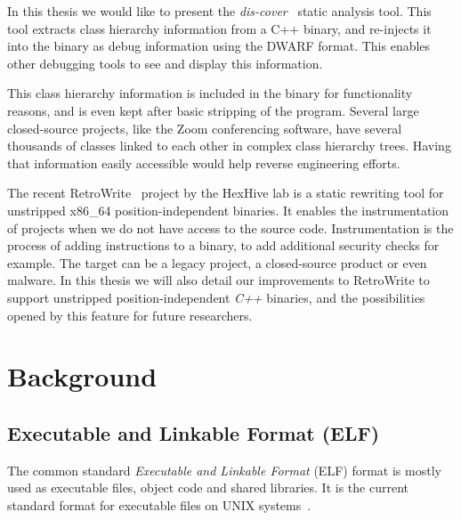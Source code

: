 \documentclass[a4paper,11pt,oneside]{report}
\begin{document}
In this thesis we would like to present the 
\emph{dis-cover}~\cite{discovergithub} static analysis tool.
This tool extracts class hierarchy information from a C++ binary, and
re-injects it into the binary as debug information using the DWARF format.
This enables other debugging tools to see and display this information.

This class hierarchy information is included in the binary for functionality
reasons, and is even kept after basic stripping of the program.
Several large closed-source projects, like the Zoom conferencing software,
have several thousands of classes linked to each other in complex class
hierarchy trees.
Having that information easily accessible would help reverse engineering
efforts.

The recent RetroWrite~\cite{dinesh20oakland} project by the HexHive lab is a 
static rewriting tool for unstripped x86\_64 position-independent binaries.
It enables the instrumentation of projects when we do not have access to the 
source code.
Instrumentation is the process of adding instructions to a binary, to add
additional security checks for example.
The target can be a legacy project, a closed-source product or even malware.
In this thesis we will also detail our improvements to RetroWrite to support
unstripped position-independent \emph{C++} binaries, and the possibilities
opened by this feature for future researchers.

\chapter{Background}




\section{Executable and Linkable Format (ELF)}

The common standard \emph{Executable and Linkable Format} (ELF) format is 
mostly used as executable files, object code and shared libraries.
It is the current standard format for executable files on UNIX
systems~\cite{elfstandard}.
\end{document}
